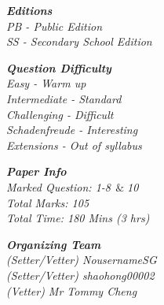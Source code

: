 \begin{multicols*}{2}
  \textit{\textbf{\Large{Editions}} \\
          \large
          \hspace*{12pt} PB - Public Edition \\
          \hspace*{12pt} SS - Secondary School Edition \\
  }

  \textit{\textbf{\Large{Question Difficulty}} \\
        \large
        \hspace*{12pt} Easy - Warm up \\
        \hspace*{12pt} Intermediate - Standard \\
        \hspace*{12pt} Challenging - Difficult \\
        \hspace*{12pt} Schadenfreude - Interesting \\
        \hspace*{12pt} Extensions - Out of syllabus \\
  }

  \textit{\textbf{\Large{Paper Info}} \\
        \large
        \hspace*{12pt} Marked Question: 1-8\(\;\,\&\;\)10 \\
        \hspace*{12pt} Total Marks: 105 \\
        \hspace*{12pt} Total Time: 180 Mins (3 hrs) \\
  }

  \textit{\textbf{\Large{Organizing Team}} \\
        \large
        \hspace*{12pt} (Setter/Vetter) NousernameSG \\
        \hspace*{12pt} (Setter/Vetter) shaohong00002 \\
        \hspace*{12pt} (Vetter) \hspace*{38pt} Mr Tommy Cheng \\
  }
\end{multicols*}

\newpage



